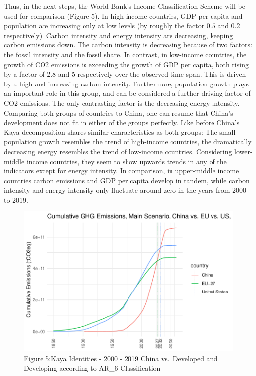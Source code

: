 \documentclass[
  12pt,
]{article}
\numberwithin{equation}{section}
\numberwithin{table}{section}
\numberwithin{figure}{section}
\begin{document}
Thus, in the next steps, the World Bank's Income Classification Scheme
will be used for comparison (Figure 5). In high-income countries, GDP
per capita and population are increasing only at low levels (by roughly
the factor 0.5 and 0.2 respectively). Carbon intensity and energy
intensity are decreasing, keeping carbon emissions down. The carbon
intensity is decreasing because of two factors: the fossil intensity and
the fossil share. In contrast, in low-income countries, the growth of
CO2 emissions is exceeding the growth of GDP per capita, both rising by
a factor of 2.8 and 5 respectively over the observed time span. This is
driven by a high and increasing carbon intensity. Furthermore,
population growth plays an important role in this group, and can be
considered a further driving factor of CO2 emissions. The only
contrasting factor is the decreasing energy intensity. Comparing both
groups of countries to China, one can resume that China's development
does not fit in either of the groups perfectly. Like before China's Kaya
decomposition shares similar characteristics as both groups: The small
population growth resembles the trend of high-income countries, the
dramatically decreasing energy resembles the trend of low-income
countries. Considering lower-middle income countries, they seem to show
upwards trends in any of the indicators except for energy intensity. In
comparison, in upper-middle income countries carbon emissions and GDP
per capita develop in tandem, while carbon intensity and energy
intensity only fluctuate around zero in the years from 2000 to 2019.

\begin{figure}
\centering
\includegraphics{Paper_files/figure-latex/unnamed-chunk-5-1.pdf}
\caption{Figure 5:Kaya Identities - 2000 - 2019\textbar{} China
vs.~Developed and Developing according to AR\_6 Classification}
\end{figure}
\end{document}
